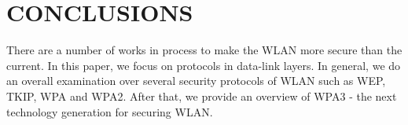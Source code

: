 \section{CONCLUSIONS}

There are a number of works in process to make the \ac{WLAN} more secure than the current. In this paper, we focus on protocols in data-link layers. In general, we do an overall examination over several security protocols of \ac{WLAN} such as \ac{WEP}, \ac{TKIP}, \ac{WPA} and \ac{WPA}2. After that, we provide an overview of \ac{WPA}3 - the next technology generation for securing \ac{WLAN}.